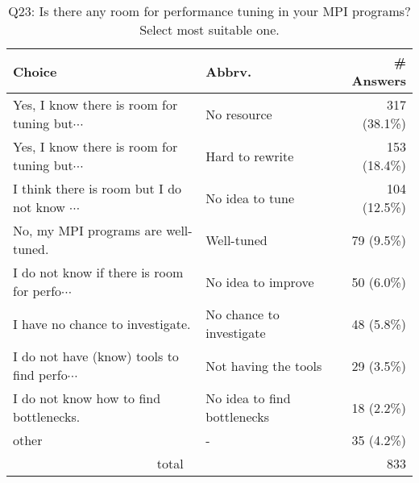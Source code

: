 \begin{table}[htb]%
\begin{center}%
\caption{Q23: Is there any room for performance tuning in your MPI programs? Select most suitable one.}%
\label{tab:Q23-ans}%
\begin{tabular}{l|l|r}%
\hline%
Choice & Abbrv. & \# Answers \\%
\hline%
{\small Yes, I know there is room for tuning but$\cdots$} & No resource & 317 (38.1\%) \\%
{\small Yes, I know there is room for tuning but$\cdots$} & Hard to rewrite & 153 (18.4\%) \\%
{\small I think there is room but I do not know $\cdots$} & No idea to tune & 104 (12.5\%) \\%
No, my MPI programs are well-tuned. & Well-tuned & 79 (9.5\%) \\%
{\small I do not know if there is room for perfo$\cdots$} & No idea to improve & 50 (6.0\%) \\%
I have no chance to investigate. & No chance to investigate & 48 (5.8\%) \\%
{\small I do not have (know) tools to find perfo$\cdots$} & Not having the tools & 29 (3.5\%) \\%
I do not know how to find bottlenecks. & No idea to find bottlenecks & 18 (2.2\%) \\%
other & - & 35 (4.2\%) \\%
\hline%
\multicolumn{2}{c}{total} & 833 \\%
\hline%
\end{tabular}%
\end{center}%
\end{table}%
